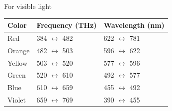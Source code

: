 \documentclass[../main.tex]{subfiles}
\begin{document}
For visible light
\begin{center}
        \begin{longtable}{| p{} | p{} | p{} |}
            \hline
            Color&Frequency (THz)&Wavelength (nm)\\\hline\hline
            Red&384 $\leftrightarrow$ 482&622 $\leftrightarrow$ 781\\
        Orange&482 $\leftrightarrow$ 503&596 $\leftrightarrow$ 622\\
        Yellow&503 $\leftrightarrow$ 520&577 $\leftrightarrow$ 596\\
        Green&520 $\leftrightarrow$ 610&492 $\leftrightarrow$ 577\\
        Blue&610 $\leftrightarrow$ 659&455 $\leftrightarrow$ 492\\
        Violet&659 $\leftrightarrow$ 769&390 $\leftrightarrow$ 455\\\hline
        \end{longtable}    
\end{center}%
\end{document}
